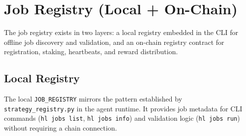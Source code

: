 \documentclass[11pt,a4paper]{article}
\begin{document}
\section{Job Registry (Local + On-Chain)}

The job registry exists in two layers: a local registry embedded in the CLI for
offline job discovery and validation, and an on-chain registry contract for
registration, staking, heartbeats, and reward distribution.

\subsection{Local Registry}

The local \texttt{JOB\_REGISTRY} mirrors the pattern established by
\texttt{strategy\_registry.py} in the agent runtime. It provides job metadata
for CLI commands (\texttt{hl jobs list}, \texttt{hl jobs info}) and validation
logic (\texttt{hl jobs run}) without requiring a chain connection.
\end{document}
